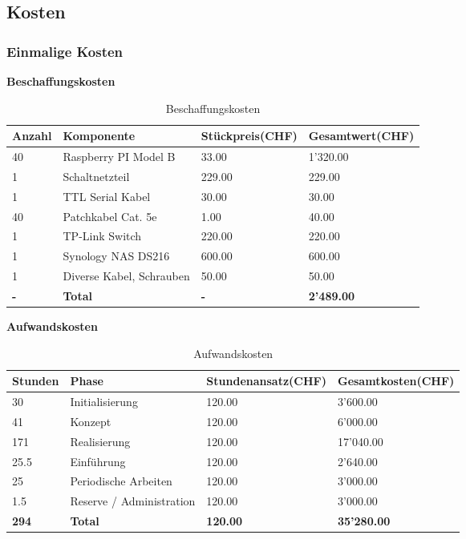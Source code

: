 
\subsection{Kosten}

\subsubsection{Einmalige Kosten}
\textbf{Beschaffungskosten}
\begin{table}[H]
\centering
\begin{tabular}{p{2cm}p{5cm}p{4cm}p{4cm}}
\hline
\rowcolor{heading} \textbf{Anzahl} & \textbf{Komponente} & \hfill \textbf{Stückpreis(CHF)} & \hfill \textbf{Gesamtwert(CHF)} \\\hline
40 & Raspberry PI Model B & \hfill 33.00 & \hfill 1'320.00 \\\hline
1 & Schaltnetzteil & \hfill  229.00 & \hfill 229.00 \\\hline
1 & TTL Serial Kabel & \hfill 30.00 & \hfill 30.00 \\\hline
40 & Patchkabel Cat. 5e & \hfill 1.00 & \hfill 40.00 \\\hline
1 & TP-Link Switch & \hfill 220.00 & \hfill 220.00 \\\hline
1 & Synology NAS DS216 & \hfill 600.00 & \hfill 600.00 \\\hline
1 & Diverse Kabel, Schrauben & \hfill 50.00 & \hfill 50.00 \\\hline
\rowcolor{subheading}\textbf{-} & \textbf{Total} & \hfill \textbf{-} & \hfill \textbf{2'489.00} \\\hline
\end{tabular}
\caption{Beschaffungskosten}
\end{table}

\textbf{Aufwandskosten}
\begin{table}[H]
\centering
\begin{tabular}{p{2cm}p{5cm}p{4cm}p{4cm}}
\hline
\rowcolor{heading} \textbf{Stunden} & \textbf{Phase} & \textbf{Stundenansatz(CHF)} &\hfill \textbf{Gesamtkosten(CHF)} \\\hline
30 & Initialisierung & \hfill 120.00 & \hfill 3'600.00 \\\hline
41 & Konzept & \hfill 120.00 & \hfill  6'000.00 \\\hline
171 & Realisierung & \hfill 120.00 & \hfill  17'040.00 \\\hline
25.5 & Einführung & \hfill 120.00 & \hfill 2'640.00 \\\hline
25 & Periodische Arbeiten & \hfill 120.00 & \hfill  3'000.00 \\\hline
1.5 & Reserve / Administration & \hfill 120.00 & \hfill 3'000.00 \\\hline
\rowcolor{subheading}\textbf{294} & \textbf{Total} &\hfill  \textbf{120.00} & \hfill \textbf{35'280.00} \\\hline
\end{tabular}
\caption{Aufwandskosten}
\end{table}

